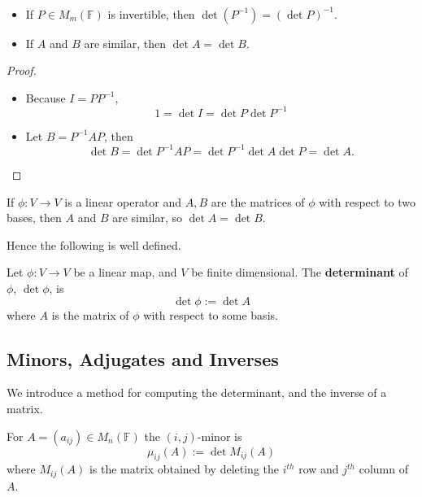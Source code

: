 \begin{corollary} $ $

  \begin{itemize}
    \item If $P \in M_m(\mathbb{F})$ is invertible, then $\det (P^{-1}) = (\det P)^{-1}$.
    \item If $A$ and $B$ are similar, then $\det A = \det B$.
  \end{itemize}
\end{corollary}
\begin{proof} $ $
   \begin{itemize}
     \item Because $I = P P^{-1}$,
       \[1 = \det I = \det P \det P^{-1}\]
     \item Let $B = P^{-1} A P$, then
       \[\det B = \det P^{-1} A P = \det P^{-1} \det A \det P = \det A.\]
   \end{itemize} 
\end{proof}

\begin{remark}

  If $\phi : V \rightarrow V$ is a linear operator and $A, B$ are the matrices of $\phi$ with respect to two bases, then $A$ and $B$ are similar, so $\det A = \det B$.

  Hence the following is well defined.
\end{remark}

\begin{definition}
  Let $\phi : V \rightarrow V$ be a linear map, and $V$ be finite dimensional. The {\bf determinant} of $\phi$, $\det \phi$, is
  \[\det \phi := \det A\]
  where $A$ is the matrix of $\phi$ with respect to some basis.
\end{definition}

\subsection{Minors, Adjugates and Inverses}

We introduce a method for computing the determinant, and the inverse of a matrix.

\begin{definition}
  For $A = (a_{ij}) \in M_n(\mathbb{F})$ the $(i, j)$-minor is
  \[\mu_{ij} (A) := \det M_{ij}(A)\]
  where $M_{ij}(A)$ is the matrix obtained by deleting the $i^{th}$ row and $j^{th}$ column of $A$.
\end{definition}

